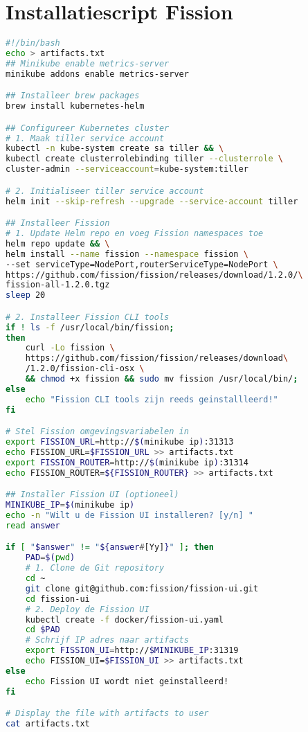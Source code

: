 \newpage
\section{Installatiescript Fission}
\label{sec:installatie-fission}
\begin{lstlisting}[language=bash]
#!/bin/bash
echo > artifacts.txt
## Minikube enable metrics-server
minikube addons enable metrics-server

## Installeer brew packages
brew install kubernetes-helm

## Configureer Kubernetes cluster
# 1. Maak tiller service account
kubectl -n kube-system create sa tiller && \
kubectl create clusterrolebinding tiller --clusterrole \
cluster-admin --serviceaccount=kube-system:tiller

# 2. Initialiseer tiller service account
helm init --skip-refresh --upgrade --service-account tiller

## Installeer Fission
# 1. Update Helm repo en voeg Fission namespaces toe
helm repo update && \
helm install --name fission --namespace fission \
--set serviceType=NodePort,routerServiceType=NodePort \
https://github.com/fission/fission/releases/download/1.2.0/\
fission-all-1.2.0.tgz
sleep 20

# 2. Installeer Fission CLI tools
if ! ls -f /usr/local/bin/fission;
then
    curl -Lo fission \
    https://github.com/fission/fission/releases/download\
    /1.2.0/fission-cli-osx \
    && chmod +x fission && sudo mv fission /usr/local/bin/;
else
    echo "Fission CLI tools zijn reeds geinstallleerd!"
fi

# Stel Fission omgevingsvariabelen in
export FISSION_URL=http://$(minikube ip):31313
echo FISSION_URL=$FISSION_URL >> artifacts.txt
export FISSION_ROUTER=http://$(minikube ip):31314
echo FISSION_ROUTER=${FISSION_ROUTER} >> artifacts.txt

## Installer Fission UI (optioneel)
MINIKUBE_IP=$(minikube ip)
echo -n "Wilt u de Fission UI installeren? [y/n] "
read answer

if [ "$answer" != "${answer#[Yy]}" ]; then
    PAD=$(pwd)
    # 1. Clone de Git repository
    cd ~
    git clone git@github.com:fission/fission-ui.git
    cd fission-ui
    # 2. Deploy de Fission UI
    kubectl create -f docker/fission-ui.yaml
    cd $PAD
    # Schrijf IP adres naar artifacts
    export FISSION_UI=http://$MINIKUBE_IP:31319
    echo FISSION_UI=$FISSION_UI >> artifacts.txt
else
    echo Fission UI wordt niet geinstalleerd!
fi

# Display the file with artifacts to user
cat artifacts.txt
\end{lstlisting}
\newpage
